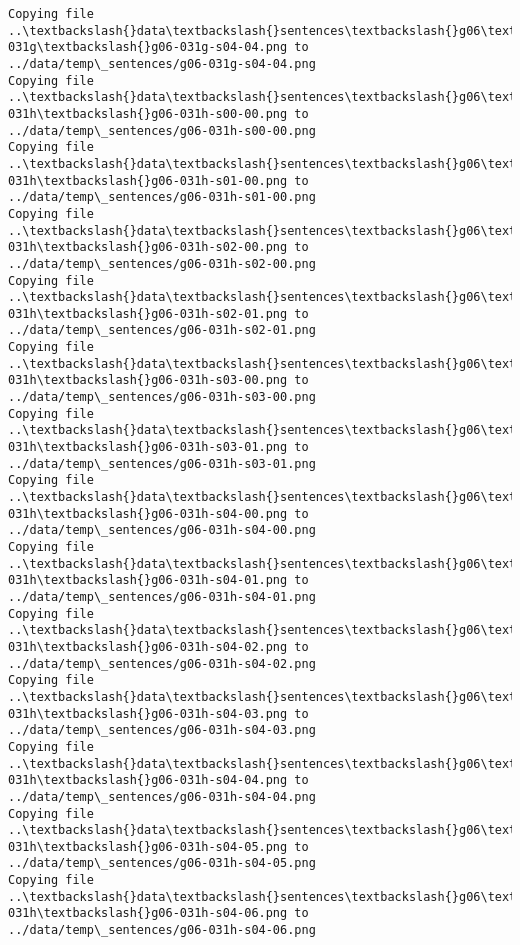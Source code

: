 \documentclass[11pt]{article}
\begin{document}
\begin{Verbatim}[commandchars=\\\{\}]
Copying file ..\textbackslash{}data\textbackslash{}sentences\textbackslash{}g06\textbackslash{}g06-031g\textbackslash{}g06-031g-s04-04.png to
../data/temp\_sentences/g06-031g-s04-04.png
Copying file ..\textbackslash{}data\textbackslash{}sentences\textbackslash{}g06\textbackslash{}g06-031h\textbackslash{}g06-031h-s00-00.png to
../data/temp\_sentences/g06-031h-s00-00.png
Copying file ..\textbackslash{}data\textbackslash{}sentences\textbackslash{}g06\textbackslash{}g06-031h\textbackslash{}g06-031h-s01-00.png to
../data/temp\_sentences/g06-031h-s01-00.png
Copying file ..\textbackslash{}data\textbackslash{}sentences\textbackslash{}g06\textbackslash{}g06-031h\textbackslash{}g06-031h-s02-00.png to
../data/temp\_sentences/g06-031h-s02-00.png
Copying file ..\textbackslash{}data\textbackslash{}sentences\textbackslash{}g06\textbackslash{}g06-031h\textbackslash{}g06-031h-s02-01.png to
../data/temp\_sentences/g06-031h-s02-01.png
Copying file ..\textbackslash{}data\textbackslash{}sentences\textbackslash{}g06\textbackslash{}g06-031h\textbackslash{}g06-031h-s03-00.png to
../data/temp\_sentences/g06-031h-s03-00.png
Copying file ..\textbackslash{}data\textbackslash{}sentences\textbackslash{}g06\textbackslash{}g06-031h\textbackslash{}g06-031h-s03-01.png to
../data/temp\_sentences/g06-031h-s03-01.png
Copying file ..\textbackslash{}data\textbackslash{}sentences\textbackslash{}g06\textbackslash{}g06-031h\textbackslash{}g06-031h-s04-00.png to
../data/temp\_sentences/g06-031h-s04-00.png
Copying file ..\textbackslash{}data\textbackslash{}sentences\textbackslash{}g06\textbackslash{}g06-031h\textbackslash{}g06-031h-s04-01.png to
../data/temp\_sentences/g06-031h-s04-01.png
Copying file ..\textbackslash{}data\textbackslash{}sentences\textbackslash{}g06\textbackslash{}g06-031h\textbackslash{}g06-031h-s04-02.png to
../data/temp\_sentences/g06-031h-s04-02.png
Copying file ..\textbackslash{}data\textbackslash{}sentences\textbackslash{}g06\textbackslash{}g06-031h\textbackslash{}g06-031h-s04-03.png to
../data/temp\_sentences/g06-031h-s04-03.png
Copying file ..\textbackslash{}data\textbackslash{}sentences\textbackslash{}g06\textbackslash{}g06-031h\textbackslash{}g06-031h-s04-04.png to
../data/temp\_sentences/g06-031h-s04-04.png
Copying file ..\textbackslash{}data\textbackslash{}sentences\textbackslash{}g06\textbackslash{}g06-031h\textbackslash{}g06-031h-s04-05.png to
../data/temp\_sentences/g06-031h-s04-05.png
Copying file ..\textbackslash{}data\textbackslash{}sentences\textbackslash{}g06\textbackslash{}g06-031h\textbackslash{}g06-031h-s04-06.png to
../data/temp\_sentences/g06-031h-s04-06.png

\end{Verbatim}
\end{document}
